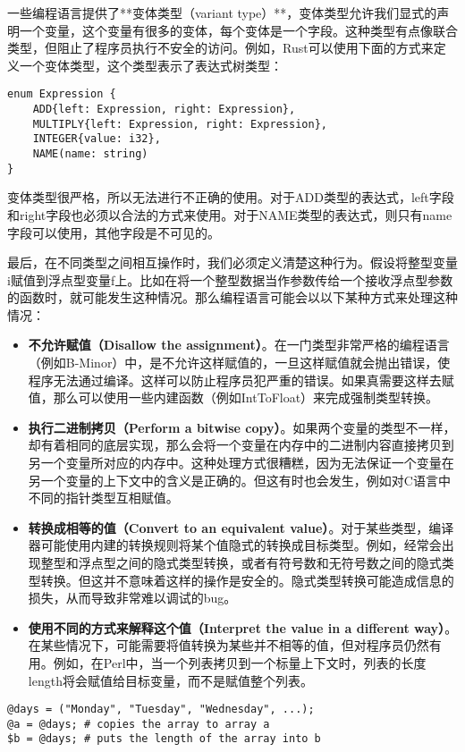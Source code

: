 \documentclass[cn,11pt,chinese]{elegantbook}
\begin{document}
一些编程语言提供了**变体类型（variant type）**，变体类型允许我们显式的声明一个变量，这个变量有很多的变体，每个变体是一个字段。这种类型有点像联合类型，但阻止了程序员执行不安全的访问。例如，Rust可以使用下面的方式来定义一个变体类型，这个类型表示了表达式树类型：

\begin{verbatim}
enum Expression {
    ADD{left: Expression, right: Expression},
    MULTIPLY{left: Expression, right: Expression},
    INTEGER{value: i32},
    NAME(name: string)
}
\end{verbatim}

变体类型很严格，所以无法进行不正确的使用。对于ADD类型的表达式，left字段和right字段也必须以合法的方式来使用。对于NAME类型的表达式，则只有name字段可以使用，其他字段是不可见的。

最后，在不同类型之间相互操作时，我们必须定义清楚这种行为。假设将整型变量i赋值到浮点型变量f上。比如在将一个整型数据当作参数传给一个接收浮点型参数的函数时，就可能发生这种情况。那么编程语言可能会以以下某种方式来处理这种情况：

\begin{itemize}
  \item \textbf{不允许赋值（Disallow the assignment）}。在一门类型非常严格的编程语言（例如B-Minor）中，是不允许这样赋值的，一旦这样赋值就会抛出错误，使程序无法通过编译。这样可以防止程序员犯严重的错误。如果真需要这样去赋值，那么可以使用一些内建函数（例如IntToFloat）来完成强制类型转换。
  \item \textbf{执行二进制拷贝（Perform a bitwise copy）}。如果两个变量的类型不一样，却有着相同的底层实现，那么会将一个变量在内存中的二进制内容直接拷贝到另一个变量所对应的内存中。这种处理方式很糟糕，因为无法保证一个变量在另一个变量的上下文中的含义是正确的。但这有时也会发生，例如对C语言中不同的指针类型互相赋值。
  \item \textbf{转换成相等的值（Convert to an equivalent value）}。对于某些类型，编译器可能使用内建的转换规则将某个值隐式的转换成目标类型。例如，经常会出现整型和浮点型之间的隐式类型转换，或者有符号数和无符号数之间的隐式类型转换。但这并不意味着这样的操作是安全的。隐式类型转换可能造成信息的损失，从而导致非常难以调试的bug。
  \item \textbf{使用不同的方式来解释这个值（Interpret the value in a different way）}。在某些情况下，可能需要将值转换为某些并不相等的值，但对程序员仍然有用。例如，在Perl中，当一个列表拷贝到一个标量上下文时，列表的长度length将会赋值给目标变量，而不是赋值整个列表。
\end{itemize}

\begin{verbatim}
@days = ("Monday", "Tuesday", "Wednesday", ...);
@a = @days; # copies the array to array a
$b = @days; # puts the length of the array into b
\end{verbatim}
\end{document}
